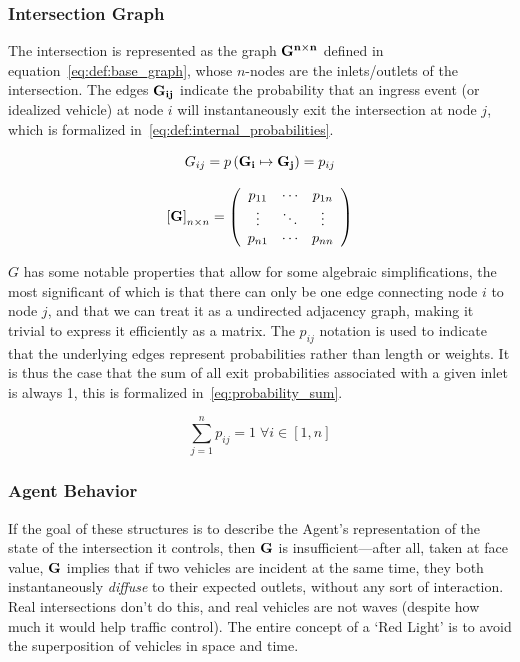 \documentclass{report}
\begin{document}
\subsubsection{Intersection Graph}
\label{sec:def:intersection_graph}

The intersection is represented as the graph $\bf{G}^{n \times n}$ defined in equation~\eqref{eq:def:base_graph}, whose $n$-nodes are the inlets/outlets of the intersection.
The edges $\bf{G}_{ij}$ indicate the probability that an ingress event (or idealized vehicle) at node $i$ will instantaneously exit the intersection at node $j$, which is formalized in~\eqref{eq:def:internal_probabilities}.

\begin{equation}\label{eq:def:internal_probabilities}
	G_{ij} = p\left(\bf{G}_i \mapsto \bf{G}_j \right) = p_{ij}
\end{equation}

\begin{equation}\label{eq:def:base_graph}
	\left[\bf{G}\right]_{n \times n} =
	\left(
		\begin{array}{ccc}
			p_{11} & \cdots & p_{1n} \\
			\vdots & \ddots & \vdots \\
			p_{n1} & \cdots & p_{nn}
		\end{array}
	\right)
\end{equation}

$G$ has some notable properties that allow for some algebraic simplifications, the most significant of which is that there can only be one edge connecting node $i$ to node $j$, and that we can treat it as a undirected adjacency graph, making it trivial to express it efficiently as a matrix.
The $p_{ij}$ notation is used to indicate that the underlying edges represent probabilities rather than length or weights.
It is thus the case that the sum of all exit probabilities associated with a given inlet is always 1, this is formalized in~\eqref{eq:probability_sum}.

\begin{equation}\label{eq:probability_sum}
	\sum_{j=1}^n p_{ij} = 1 \; \forall i \in \left[1, n\right]
\end{equation}


\subsubsection{Agent Behavior}
\label{sec:def:behaviors}

If the goal of these structures is to describe the Agent's representation of the state of the intersection it controls, then $\bf{G}$ is insufficient---after all, taken at face value, $\bf{G}$ implies that if two vehicles are incident at the same time, they both instantaneously \emph{diffuse} to their expected outlets, without any sort of interaction.
Real intersections don't do this, and real vehicles are not waves (despite how much it would help traffic control).
The entire concept of a `Red Light' is to avoid the superposition of vehicles in space and time.
\end{document}
